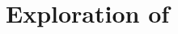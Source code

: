 \section{Exploration of \solasote}
\label{S:explore}



\begin{comment}
\subsection{Popularity of \solasote's entities}

We may be interested in the popularity of different kinds of entities
in the ontology. For instance, we may use the number of distinct
contributions referring to an entity for ranking all entities of a
certain kind (such as languages, technologies, or concepts). 








\end{comment}